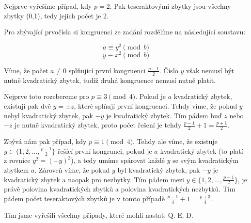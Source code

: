 \documentclass{fkssolpub}
\author{Ondřej Sedláček}
\begin{document}
Nejprve vyřešíme případ, kdy $p = 2$. Pak teseraktovými zbytky jsou všechny zbytky (0,1), tedy jejich počet je 2.

Pro zbývající prvočísla si kongruenci ze zadání rozdělíme na následující soustavu:

\[
	a \equiv y^2 \pmod{b}
\]
\[
	y \equiv x^2 \pmod{b}
\]

Víme, že počet $a \neq 0$ splňující první kongruenci $\frac{p - 1}{2}$. Číslo $y$ však nemusí být nutně kvadratický zbytek, tudíž druhá kongruence nemusí nutně platit.

Nejprve toto rozebereme pro $p \equiv 3 \pmod{4}$. Pokud je $a$ kvadratický zbytek, existují pak dvě $y = \pm z$, které splňují první kongruenci. Tehdy víme, že pokud $y$ nebyl kvadratický zbytek, pak $-y$ je kvadratický zbytek. Tím pádem buď $z$ nebo $-z$ je nutně kvadratický zbytek, proto počet řešení je tehdy $\frac{p - 1}{2} + 1 = \frac{p + 1}{2}$.

Zbývá nám pak případ, kdy $p \equiv 1 \pmod{4}$. Tehdy ale víme, že existuje $y \in \{1, 2, \dots, \frac{p - 1}{2}\}$ řešící první kongrunci, pokud je $a$ kvadratický zbytek (to platí z rovnice $y^2 = (-y)^2$), a tedy umíme spárovat každé $y$ se svým kvadratickým zbytkem $a$. Zároveň víme, že pokud $y$ byl kvadratický zbytek, pak $-y$ je kvadratický zbytek a naopak pro nezbytky. Tím pádem mezi $y \in \{1, 2, \dots, \frac{p - 1}{2}\}$, je právě polovina kvadratických zbytků a polovina kvadratických nezbytků. Tím pádem počet teseraktových zbytků je v tomto případě $\frac{p - 1}{4} + 1 = \frac{p + 3}{4}$.

Tím jsme vyřešili všechny případy, které mohli nastat. Q. E. D.
\end{document}
